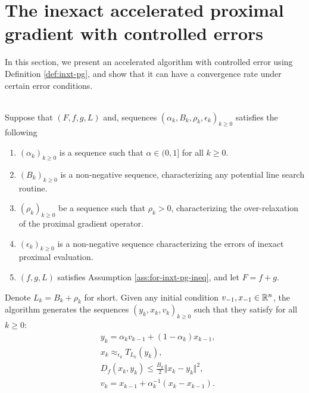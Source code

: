\documentclass[12pt]{article}
\begin{document}
\section{The inexact accelerated proximal gradient with controlled errors}
    In this section, we present an accelerated algorithm with controlled error using Definition \ref{def:inxt-pg}, and show that it can have a convergence rate under certain error conditions. 
    \begin{definition}\;\label{def:inxt-apg}\\
        Suppose that $(F, f, g, L)$ and, sequences $(\alpha_k, B_k, \rho_k, \epsilon_k)_{k \ge 0}$ satisfies the following
        \begin{enumerate}[nosep]
            \item $(\alpha_k)_{k \ge 0}$ is a sequence such that $\alpha \in (0, 1]$ for all $k \ge 0$. 
            \item $(B_k)_{k \ge 0}$ is a non-negative sequence, characterizing any potential line search routine. 
            \item $(\rho_k)_{k \ge 0}$ be a sequence such that $\rho_k > 0$, characterizing the over-relaxation of the proximal gradient operator. 
            \item $(\epsilon_k)_{k \ge 0}$ is a non-negative sequence characterizing the errors of inexact proximal evaluation.
            \item $(f, g, L)$ satisfies Assumption \ref{ass:for-inxt-pg-ineq}, and let $F = f + g$. 
        \end{enumerate}
        Denote $L_k = B_k + \rho_k$ for short. 
        Given any initial condition $v_{-1}, x_{-1} \in \mathbb R^n$, the algorithm generates the sequences $(y_k, x_k, v_k)_{k \ge 0}$ such that they satisfy for all $k \ge 0$: 
        \begin{align*}
            & y_k = \alpha_k v_{k - 1} + (1 - \alpha_k)x_{k - 1}, 
            \\
            & x_k \approx_{\epsilon_k} T_{L_k}(y_k), 
            \\
            & D_f(x_k, y_k) \le \frac{B_k}{2}\Vert x_k - y_k\Vert^2, 
            \\
            & v_k = x_{k - 1} + \alpha_k^{-1}(x_k - x_{k - 1}). 
        \end{align*}
    \end{definition}
\end{document}
